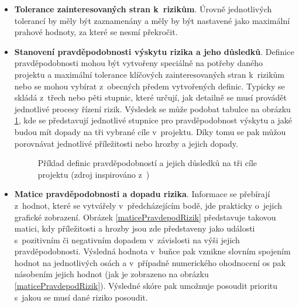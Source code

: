 \begin{itemize}
    \item \textbf{Tolerance zainteresovaných stran k~rizikům}. Úrovně jednotlivých tolerancí by měly být zaznamenány a měly by být nastavené jako maximální prahové hodnoty, za které se nesmí překročit.
    \item \textbf{Stanovení pravděpodobnosti výskytu rizika a jeho důsledků}. Definice pravděpodobnosti mohou být vytvořeny speciálně na potřeby daného projektu a maximální tolerance klíčových zainteresovaných stran k~rizikům nebo se mohou vybírat z~obecných předem vytvořených definic. Typicky se skládá z~třech nebo pěti stupnic, které určují, jak detailně se musí provádět jednotlivé procesy řízení rizik. Výsledek se může podobat tabulce na obrázku \ref{pravdepodRizik}, kde se představují jednotlivé stupnice pro pravděpodobnost výskytu a jaké budou mít dopady na tři vybrané cíle v~projektu. Díky tomu se pak můžou porovnávat jednotlivé příležitosti nebo hrozby a jejich dopady.
    
    \begin{figure}[ht]
    \begin{center}
    \caption{Příklad definic pravděpodobností a jejich důsledků na tři cíle projektu (zdroj inspirováno z~\cite{PMBOK})}
    \label{pravdepodRizik}
    \end{center}
    \end{figure}

    \item \textbf{Matice pravděpodobnosti a dopadu rizika}. Informace se přebírají z~hodnot, které se vytvářely v~předcházejícím bodě, jde prakticky o~jejich grafické zobrazení. Obrázek \ref{maticePravdepodRizik} představuje takovou matici, kdy příležitosti a hrozby jsou zde představeny jako události s~pozitivním či negativním dopadem v~závislosti na výši jejich pravděpodobnosti. Výsledná hodnota v~buňce pak vznikne slovním spojením hodnot na jednotlivých osách a v~případně numerického ohodnocení os pak násobením jejich hodnot (jak je zobrazeno na obrázku \ref{maticePravdepodRizik}). Výsledné skóre pak umožnuje posoudit prioritu s~jakou se musí dané riziko posoudit.
    

\end{itemize}
